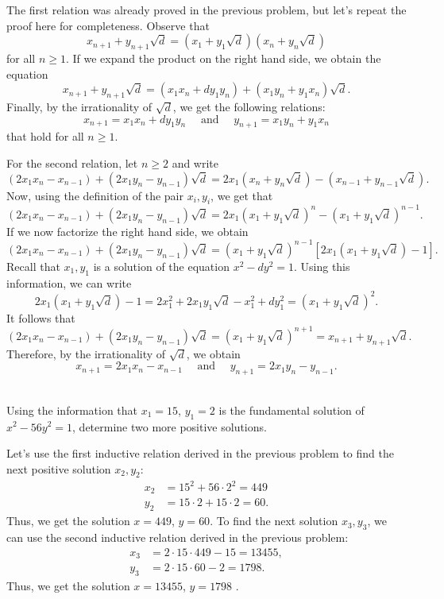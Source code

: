 \begin{solution}
    The first relation was already proved in the previous problem, but let's repeat the proof here for completeness. Observe that
    $$x_{n+1} + y_{n+1}\sqrt{d} = (x_1 + y_1\sqrt{d})(x_n + y_n\sqrt{d})$$
    for all $n \geq 1$. If we expand the product on the right hand side, we obtain the equation
    $$x_{n+1} + y_{n+1}\sqrt{d} = (x_1x_n + dy_1y_n) + (x_1y_n + y_1x_n)\sqrt{d}.$$
    Finally, by the irrationality of $\sqrt{d}$, we get the following relations:
    $$x_{n+1} = x_1x_n + dy_1y_n \quad \text{ and } \quad y_{n+1} = x_1y_n + y_1x_n$$
    that hold for all $n \geq 1$. 
    
    For the second relation, let $n \geq 2$ and write
    $$(2x_1x_n - x_{n-1}) + (2x_1y_n - y_{n-1})\sqrt{d} = 2x_1(x_n + y_n\sqrt{d}) - (x_{n-1} + y_{n-1}\sqrt{d}).$$
    Now, using the definition of the pair $x_i,y_i$, we get that
    $$(2x_1x_n - x_{n-1}) + (2x_1y_n - y_{n-1})\sqrt{d} = 2x_1(x_1 + y_1\sqrt{d})^n - (x_1 + y_1\sqrt{d})^{n-1}.$$
    If we now factorize the right hand side, we obtain
    $$(2x_1x_n - x_{n-1}) + (2x_1y_n - y_{n-1})\sqrt{d} = (x_1 + y_1\sqrt{d})^{n-1}[2x_1(x_1 + y_1\sqrt{d}) - 1].$$
    Recall that $x_1, y_1$ is a solution of the equation $x^2 - dy^2 = 1$. Using this information, we can write
    $$2x_1(x_1 + y_1\sqrt{d}) - 1 = 2x_1^2 + 2x_1y_1\sqrt{d} - x_1^2 + dy_1^2 = (x_1 + y_1\sqrt{d})^2.$$
    It follows that
    $$(2x_1x_n - x_{n-1}) + (2x_1y_n - y_{n-1})\sqrt{d} = (x_1 + y_1\sqrt{d})^{n+1} = x_{n+1} + y_{n+1}\sqrt{d}.$$
    Therefore, by the irrationality of $\sqrt{d}$, we obtain
    $$x_{n+1} = 2x_1x_n - x_{n-1} \quad \text{ and } \quad y_{n+1} = 2x_1y_n - y_{n-1}.$$ \\
\end{solution}

\begin{exercise}
    Using the information that $x_1 = 15$, $y_1 = 2$ is the fundamental solution of $x^2 - 56y^2 = 1$, determine two more positive solutions. \\
\end{exercise}

\begin{solution}
    Let's use the first inductive relation derived in the previous problem to find the next positive solution $x_2, y_2$:
    \begin{align*}
        x_2 &= 15^2 + 56\cdot 2^2 = 449 \\
        y_2 &= 15\cdot 2 + 15\cdot 2 = 60.
    \end{align*}
    Thus, we get the solution $x = 449$, $y = 60$. To find the next solution $x_3, y_3$, we can use the second inductive relation derived in the previous problem:
    \begin{align*}
        x_3 &= 2\cdot 15\cdot 449 - 15 = 13455, \\
        y_3 &= 2\cdot 15\cdot 60 - 2 = 1798.
    \end{align*}
    Thus, we get the solution $x = 13455$, $y = 1798$ . \\
\end{solution}

